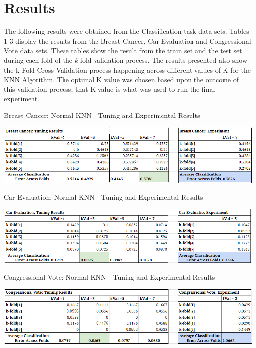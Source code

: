 \documentclass[twoside,11pt]{article}
\begin{document}
\newpage

\section{Results}
The following results were obtained from the Classification task data sets.
Tables 1-3 display the results from the Breast Cancer, Car Evaluation and Congressional Vote data sets. These tables show the result from the train set and the test set during each fold of the \textit{k}-fold validation process. The results presented also show the k-Fold Cross Validation process happening across different values of K for the KNN Algorithm. The optimal K value was chosen based upon the outcome of this validation process, that K value is what was used to run the final experiment.\\ 

\begin{table}[h!]
	\begin{center}
		\caption{Breast Cancer: Normal KNN - Tuning and Experimental Results}
		\label{tab:table1}
		\includegraphics[scale=.7]{BC_Results}\newline
	\end{center}
\end{table}

\begin{table}[h!]
	\begin{center}
		\caption{Car Evaluation: Normal KNN - Tuning and Experimental Results}
		\label{tab:table2}
		\includegraphics[scale=.7]{CE_Results}\newline
	\end{center}
\end{table}

\begin{table}[h!]
	\begin{center}
		\caption{Congressional Vote: Normal KNN - Tuning and Experimental Results}
		\label{tab:table3}
		\includegraphics[scale=.7]{CV_Results}\newline
	\end{center}
\end{table}
\newpage
\end{document}
